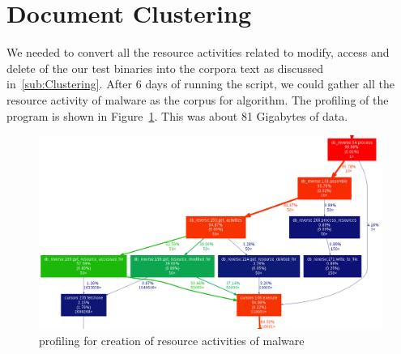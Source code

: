 \section{Document Clustering}
\label{sec:Document Clustering}
We needed to convert all the resource activities related to modify, access and delete of the our test binaries into the corpora text as discussed in~\autoref{sub:Clustering}.
After 6 days of running the script, we could gather all the resource activity of {\gettotalmalwareii} malware as the corpus for algorithm.
The profiling of the program is shown in Figure~\ref{fig:actcreation}.
This was about 81 Gigabytes of data.
\begin{figure}
\begin{center}
  \includegraphics[scale=0.3]{figures/activities_creation.png}
\end{center}
\caption{profiling for creation of resource activities of malware}
\label{fig:actcreation}
\end{figure}
